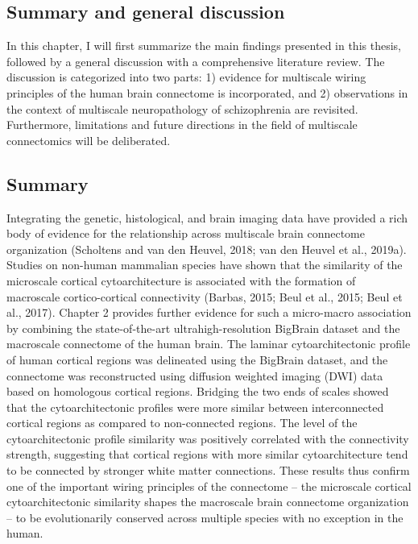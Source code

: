 \pagestyle{MyStyle}

\begin{refsection}

\chapter{Summary and general discussion}
\label{ch:summary}

\newpage

In this chapter, I will first summarize the main findings presented in this thesis, followed by a general discussion with a comprehensive literature review. The discussion is categorized into two parts: 1) evidence for multiscale wiring principles of the human brain connectome is incorporated, and 2) observations in the context of multiscale neuropathology of schizophrenia are revisited. Furthermore, limitations and future directions in the field of multiscale connectomics will be deliberated.

\section*{Summary}
Integrating the genetic, histological, and brain imaging data have provided a rich body of evidence for the relationship across multiscale brain connectome organization (Scholtens and van den Heuvel, 2018; van den Heuvel et al., 2019a). Studies on non-human mammalian species have shown that the similarity of the microscale cortical cytoarchitecture is associated with the formation of macroscale cortico-cortical connectivity (Barbas, 2015; Beul et al., 2015; Beul et al., 2017). Chapter 2 provides further evidence for such a micro-macro association by combining the state-of-the-art ultrahigh-resolution BigBrain dataset and the macroscale connectome of the human brain. The laminar cytoarchitectonic profile of human cortical regions was delineated using the BigBrain dataset, and the connectome was reconstructed using diffusion weighted imaging (DWI) data based on homologous cortical regions. Bridging the two ends of scales showed that the cytoarchitectonic profiles were more similar between interconnected cortical regions as compared to non-connected regions. The level of the cytoarchitectonic profile similarity was positively correlated with the connectivity strength, suggesting that cortical regions with more similar cytoarchitecture tend to be connected by stronger white matter connections. These results thus confirm one of the important wiring principles of the connectome – the microscale cortical cytoarchitectonic similarity shapes the macroscale brain connectome organization – to be evolutionarily conserved across multiple species with no exception in the human. 


\end{refsection}
